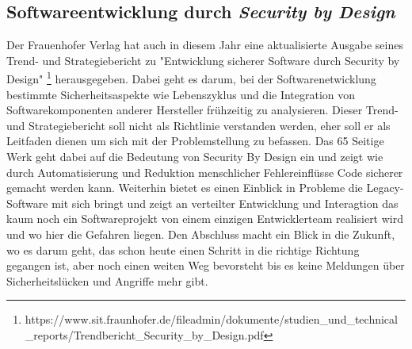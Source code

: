 \subsection{Softwareentwicklung durch \textit{Security by Design}}
Der Frauenhofer Verlag hat auch in diesem Jahr eine aktualisierte 
Ausgabe seines Trend- und Strategiebericht zu "Entwicklung sicherer 
Software durch Security by Design"
\footnote{https://www.sit.fraunhofer.de/fileadmin/dokumente/studien_und_technical_reports/Trendbericht_Security_by_Design.pdf} 
herausgegeben.
Dabei geht es darum, bei der Softwarenetwicklung bestimmte
Sicherheitsaspekte wie Lebenszyklus und die Integration von 
Softwarekomponenten anderer Hersteller frühzeitig zu analysieren.
Dieser Trend- und Strategiebericht soll nicht als Richtlinie verstanden
werden, eher soll er als Leitfaden dienen um sich mit der Problemstellung
zu befassen.
Das 65 Seitige Werk geht dabei auf die Bedeutung von Security By Design ein
und zeigt wie durch Automatisierung und Reduktion menschlicher Fehlereinflüsse
Code sicherer gemacht werden kann. Weiterhin bietet es einen Einblick
in Probleme die Legacy-Software mit sich bringt und zeigt an verteilter 
Entwicklung und Interagtion das kaum noch ein Softwareprojekt von einem
einzigen Entwicklerteam realisiert wird und wo hier die Gefahren liegen.
Den Abschluss macht ein Blick in die Zukunft, wo es darum geht, das
schon heute einen Schritt in die richtige Richtung gegangen ist, 
aber noch einen weiten Weg bevorsteht bis es keine Meldungen
über Sicherheitslücken und Angriffe mehr gibt.
